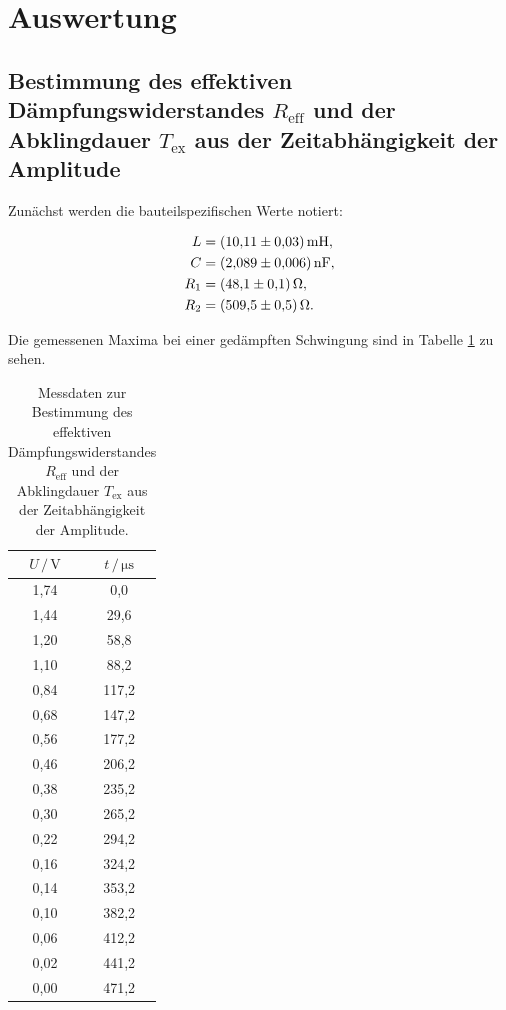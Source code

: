 \section{Auswertung}
\label{sec:Auswertung}

\subsection{Bestimmung des effektiven Dämpfungswiderstandes $R_\text{eff}$ und der Abklingdauer $T_\text{ex}$ 
aus der Zeitabhängigkeit der Amplitude}

Zunächst werden die bauteilspezifischen Werte notiert:

\begin{align*}
L &= \SI{10.11+-0.03}{\milli\henry},\\
C &= \SI{2.089+-0.006}{\nano\farad},\\
R_1 &= \SI{48.1+-0.1}{\ohm},\\
R_2 &= \SI{509.5+-0.5}{\ohm}.
\end{align*}

Die gemessenen Maxima bei einer gedämpften Schwingung sind 
in Tabelle \ref{tab:Messdaten1} zu sehen. 

\begin{table}
\centering
\caption{Messdaten zur Bestimmung des effektiven Dämpfungswiderstandes $R_\text{eff}$ und 
der Abklingdauer $T_\text{ex}$ aus der Zeitabhängigkeit der Amplitude.}
\label{tab:Messdaten1}
\begin{tabular}{c c}
\toprule
$U \,/\, \si{\volt}$ & $t \,/\, \si{\micro\second}$\\
\midrule
1,74 &   0,0\\
1,44 &  29,6\\
1,20 &  58,8\\
1,10 &  88,2\\
0,84 & 117,2\\
0,68 & 147,2\\
0,56 & 177,2\\
0,46 & 206,2\\
0,38 & 235,2\\
0,30 & 265,2\\
0,22 & 294,2\\ 
0,16 & 324,2\\
0,14 & 353,2\\
0,10 & 382,2\\
0,06 & 412,2\\
0,02 & 441,2\\
0,00 & 471,2\\
\bottomrule
\end{tabular}
\end{table} 

